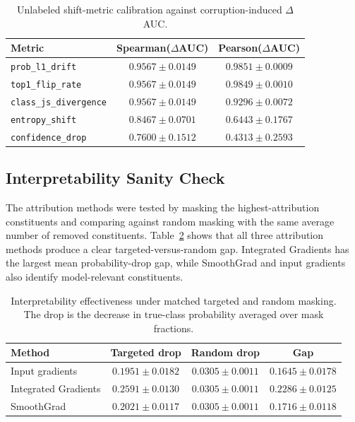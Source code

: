 \begin{table}[t]
\centering
\caption{Unlabeled shift-metric calibration against corruption-induced $\Delta$AUC.}
\label{tab:shift-calib}
\begin{tabular}{lcc}
\toprule
Metric & Spearman($\Delta$AUC) & Pearson($\Delta$AUC) \\
\midrule
\texttt{prob\_l1\_drift} & $0.9567 \pm 0.0149$ & $0.9851 \pm 0.0009$ \\
\texttt{top1\_flip\_rate} & $0.9567 \pm 0.0149$ & $0.9849 \pm 0.0010$ \\
\texttt{class\_js\_divergence} & $0.9567 \pm 0.0149$ & $0.9296 \pm 0.0072$ \\
\texttt{entropy\_shift} & $0.8467 \pm 0.0701$ & $0.6443 \pm 0.1767$ \\
\texttt{confidence\_drop} & $0.7600 \pm 0.1512$ & $0.4313 \pm 0.2593$ \\
\bottomrule
\end{tabular}
\end{table}

\subsection{Interpretability Sanity Check}

The attribution methods were tested by masking the highest-attribution constituents and comparing against random masking with the same average number of removed constituents. Table~\ref{tab:interp-effect} shows that all three attribution methods produce a clear targeted-versus-random gap. Integrated Gradients has the largest mean probability-drop gap, while SmoothGrad and input gradients also identify model-relevant constituents.

\begin{table}[t]
\centering
\caption{Interpretability effectiveness under matched targeted and random masking. The drop is the decrease in true-class probability averaged over mask fractions.}
\label{tab:interp-effect}
\begin{tabular}{lccc}
\toprule
Method & Targeted drop & Random drop & Gap \\
\midrule
Input gradients & $0.1951 \pm 0.0182$ & $0.0305 \pm 0.0011$ & $0.1645 \pm 0.0178$ \\
Integrated Gradients & $0.2591 \pm 0.0130$ & $0.0305 \pm 0.0011$ & $0.2286 \pm 0.0125$ \\
SmoothGrad & $0.2021 \pm 0.0117$ & $0.0305 \pm 0.0011$ & $0.1716 \pm 0.0118$ \\
\bottomrule
\end{tabular}
\end{table}

